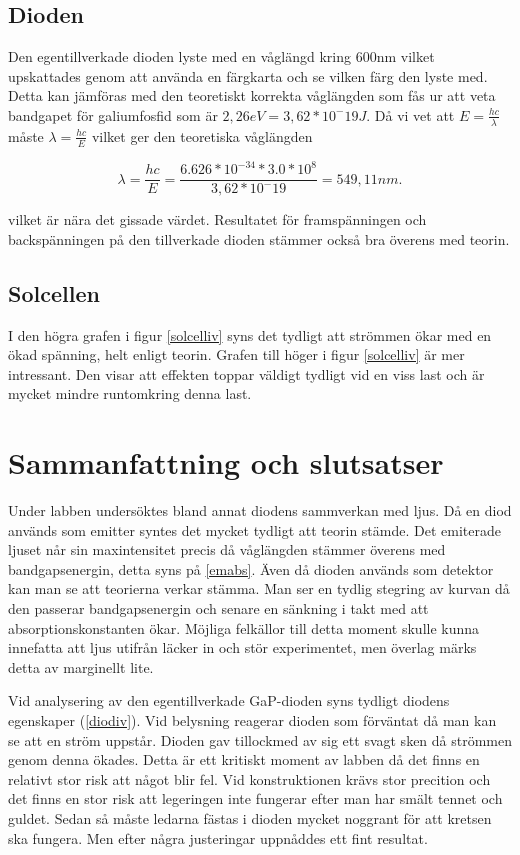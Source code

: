 \documentclass[a4paper]{article}
\begin{document}
\subsection{Dioden}
Den egentillverkade dioden lyste med en våglängd kring 600nm vilket upskattades genom att använda en färgkarta och se vilken färg den lyste med. Detta kan jämföras med den teoretiskt korrekta våglängden som fås ur att veta bandgapet för galiumfosfid som är $2,26eV = 3,62*10^-19J$. Då vi vet att $E = \frac{hc}{\lambda}$ måste $\lambda = \frac{hc}{E}$ vilket ger den teoretiska våglängden

\begin{equation}
	\lambda = \frac{hc}{E} = \frac{6.626*10^{-34} * 3.0*10^8}{3,62*10^-19} = 549,11 nm.
\end{equation}

vilket är nära det gissade värdet. Resultatet för framspänningen och backspänningen på den tillverkade dioden stämmer också bra överens med teorin.

\subsection{Solcellen}
I den högra grafen i figur \ref{solcelliv} syns det tydligt att strömmen ökar med en ökad spänning, helt enligt teorin. Grafen till höger i figur \ref{solcelliv} är mer intressant. Den visar att effekten toppar väldigt tydligt vid en viss last och är mycket mindre runtomkring denna last.


\section{Sammanfattning och slutsatser}
Under labben undersöktes bland annat diodens sammverkan med ljus. Då en diod används som emitter syntes det mycket tydligt att teorin stämde. Det emiterade ljuset når sin maxintensitet precis då våglängden stämmer överens med bandgapsenergin, detta syns på \ref{emabs}. Även då dioden används som detektor kan man se att teorierna verkar stämma. Man ser en tydlig stegring av kurvan då den passerar bandgapsenergin och senare en sänkning i takt med att absorptionskonstanten ökar. Möjliga felkällor till detta moment skulle kunna innefatta att ljus utifrån läcker in och stör experimentet, men överlag märks detta av marginellt lite.

Vid analysering av den egentillverkade GaP-dioden syns tydligt diodens egenskaper (\ref{diodiv}). Vid belysning reagerar dioden som förväntat då man kan se att en ström uppstår. Dioden gav tillockmed av sig ett svagt sken då strömmen genom denna ökades. Detta är ett kritiskt moment av labben då det finns en relativt stor risk att något blir fel. Vid konstruktionen krävs stor precition och det finns en stor risk att legeringen inte fungerar efter man har smält tennet och guldet. Sedan så måste ledarna fästas i dioden mycket noggrant för att kretsen ska fungera. Men efter några justeringar uppnåddes ett fint resultat. 
\end{document}
